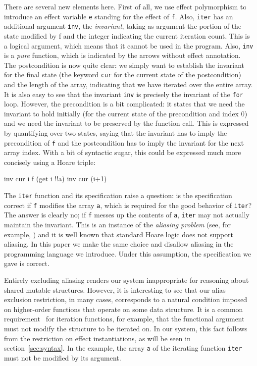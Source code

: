 \documentclass[a4paper]{llncs}
\begin{document}
There are several new elements here. First of all, we use effect polymorphism
to introduce an effect variable {\tt e} standing for the effect of {\tt f}.
Also, {\tt iter} has an additional argument {\tt inv}, the {\em invariant},
taking as argument the portion of the state modified by f and the integer
indicating the current iteration count. This is a logical argument, which
means that it cannot be used in the program. Also, {\tt inv} is a {\em pure}
function, which is indicated by the arrows without effect annotation. The
postcondition is now quite clear: we simply want to establish the invariant
for the final state (the keyword {\tt cur} for the current state of the
postcondition) and the length of the array, indicating that we have iterated
over the entire array. It is also easy to see that the invariant {\tt inv} is
precisely the invariant of the {\tt for} loop. However, the precondition is a
bit complicated: it states that we need the invariant to hold initially (for
the current state of the precondition and index $0$) and we need the invariant
to be preserved by the function call. This is expressed by quantifying over
two states, saying that the invariant has to imply the precondition of {\tt f}
and the postcondition has to imply the invariant for the next array index.
With a bit of syntactic sugar, this could be expressed much more concisely
using a Hoare triple:
\begin{who}
  { inv cur i} f (get i !!a) {inv cur (i+1)}
\end{who}

The {\tt iter} function and its specification raise a question: is the
specification correct if {\tt f} modifies the array {\tt a}, which is required
for the good behavior of {\tt iter}? The answer is clearly no; if {\tt f}
messes up the contents of {\tt a}, {\tt iter} may not actually maintain the
invariant.  This is an instance of the {\em aliasing problem} (see, for
example, \cite{reynolds78popl}) and it is well known that standard Hoare logic
does not support aliasing. In this paper we make the same choice and disallow
aliasing in the programming language we introduce. Under this assumption, the
specification we gave is correct. 

Entirely excluding aliasing renders our system inappropriate for
reasoning about shared mutable structures. However, it is interesting
to see that our alias exclusion restriction, in many cases,
corresponds to a natural condition imposed on higher-order functions
that operate on some data structure. It is a common
requirement~\cite{Nanevski08Awkward,Krishnaswami06} for iteration
functions, for example, that the functional argument must not modify
the structure to be iterated on. In our system, this fact follows from
the restriction on effect instantiations, as will be seen in
section~\ref{sec:syntax}. In the example, the array {\tt a}
of the iterating function {\tt iter} must not be modified by its
argument.
\end{document}
